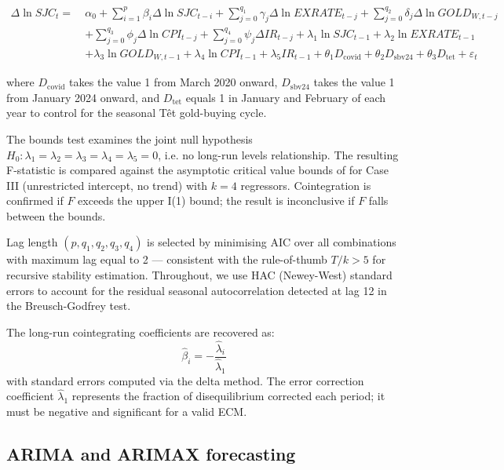 \documentclass[12pt,a4paper]{article}
\begin{document}
\begin{equation}
\label{eq:ardl}
\begin{split}
\Delta\ln SJC_t =\ & \alpha_0
  + \sum_{i=1}^{p} \beta_i \Delta\ln SJC_{t-i}
  + \sum_{j=0}^{q_1} \gamma_j \Delta\ln EXRATE_{t-j}
  + \sum_{j=0}^{q_2} \delta_j \Delta\ln GOLD_{W,t-j} \\
  &+ \sum_{j=0}^{q_3} \phi_j \Delta\ln CPI_{t-j}
  + \sum_{j=0}^{q_4} \psi_j \Delta IR_{t-j}
  + \lambda_1 \ln SJC_{t-1}
  + \lambda_2 \ln EXRATE_{t-1} \\
  &+ \lambda_3 \ln GOLD_{W,t-1}
  + \lambda_4 \ln CPI_{t-1}
  + \lambda_5 IR_{t-1}
  + \theta_1 D_{\text{covid}}
  + \theta_2 D_{\text{sbv24}}
  + \theta_3 D_{\text{tet}}
  + \varepsilon_t
\end{split}
\end{equation}

where $D_{\text{covid}}$ takes the value 1 from March 2020 onward,
$D_{\text{sbv24}}$ takes the value 1 from January 2024 onward, and
$D_{\text{tet}}$ equals 1 in January and February of each year to
control for the seasonal T\^{e}t gold-buying cycle.

The bounds test examines the joint null hypothesis
$H_0: \lambda_1 = \lambda_2 = \lambda_3 = \lambda_4 = \lambda_5 = 0$,
i.e. no long-run levels relationship.
The resulting F-statistic is compared against the asymptotic critical
value bounds of \citet{pesaran2001} for Case III (unrestricted intercept,
no trend) with $k=4$ regressors. Cointegration is confirmed if
$F$ exceeds the upper I(1) bound; the result is inconclusive if $F$ falls
between the bounds.

Lag length $(p, q_1, q_2, q_3, q_4)$ is selected by minimising AIC over
all combinations with maximum lag equal to 2 --- consistent with the
rule-of-thumb $T/k > 5$ for recursive stability estimation.
Throughout, we use HAC (Newey-West) standard errors to account for the
residual seasonal autocorrelation detected at lag 12 in the
Breusch-Godfrey test.

The long-run cointegrating coefficients are recovered as:
\begin{equation}
\hat{\beta}_i = -\frac{\hat{\lambda}_i}{\hat{\lambda}_1}
\end{equation}
with standard errors computed via the delta method. The error correction
coefficient $\hat{\lambda}_1$ represents the fraction of disequilibrium
corrected each period; it must be negative and significant for a valid ECM.

\subsection{ARIMA and ARIMAX forecasting}
\end{document}
